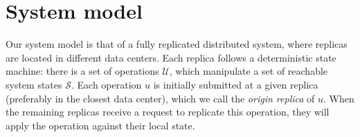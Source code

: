 \section{System model}
\label{sec:model}


Our system model is that of a
fully replicated distributed system, where replicas are located in different data centers. Each replica follows a deterministic state machine: there is a set of operations $\mathcal{U}$, which manipulate
a set of reachable system states $\mathcal{S}$. %
Each operation $u$ is initially submitted at a given replica (preferably in the closest data center), which we
call the \emph{origin replica} of $u$.
When the remaining replicas receive a request to replicate this operation, they will apply the operation against their local state. 



